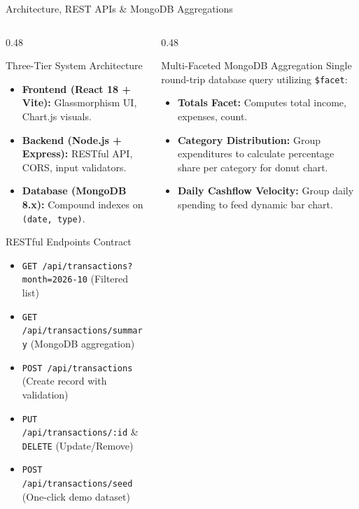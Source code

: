 \documentclass[aspectratio=169, 10pt]{beamer}
\begin{document}
\begin{frame}{Architecture, REST APIs \& MongoDB Aggregations}
  \begin{columns}[T]
    \begin{column}{0.48\textwidth}
      \begin{block}{Three-Tier System Architecture}
        \scriptsize
        \begin{itemize}
          \item \textbf{Frontend (React 18 + Vite):} Glassmorphism UI, Chart.js visuals.
          \item \textbf{Backend (Node.js + Express):} RESTful API, CORS, input validators.
          \item \textbf{Database (MongoDB 8.x):} Compound indexes on \texttt{(date, type)}.
        \end{itemize}
      \end{block}

      \begin{exampleblock}{RESTful Endpoints Contract}
        \scriptsize
        \begin{itemize}
          \item \texttt{GET  /api/transactions?month=2026-10} (Filtered list)
          \item \texttt{GET  /api/transactions/summary} (MongoDB aggregation)
          \item \texttt{POST /api/transactions} (Create record with validation)
          \item \texttt{PUT /api/transactions/:id} \& \texttt{DELETE} (Update/Remove)
          \item \texttt{POST /api/transactions/seed} (One-click demo dataset)
        \end{itemize}
      \end{exampleblock}
    \end{column}

    \begin{column}{0.48\textwidth}
      \begin{block}{Multi-Faceted MongoDB Aggregation}
        \scriptsize
        Single round-trip database query utilizing \texttt{\$facet}:
        \begin{itemize}
          \item \textbf{Totals Facet:} Computes total income, expenses, count.
          \item \textbf{Category Distribution:} Group expenditures to calculate percentage share per category for donut chart.
          \item \textbf{Daily Cashflow Velocity:} Group daily spending to feed dynamic bar chart.
        \end{itemize}
      \end{block}


\end{column}
\end{columns}
\end{frame}
\end{document}
